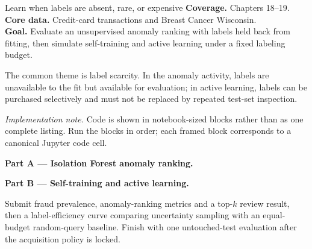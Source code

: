 
\begin{labproject}{Learn when labels are absent, rare, or expensive}
\textbf{Coverage.} Chapters 18--19.\\
\textbf{Core data.} Credit-card transactions and Breast Cancer Wisconsin.\\
\textbf{Goal.} Evaluate an unsupervised anomaly ranking with labels held back from fitting, then simulate self-training and active learning under a fixed labeling budget.

\begin{labmode}
The common theme is label scarcity. In the anomaly activity, labels are unavailable to the fit but available for evaluation; in active learning, labels can be purchased selectively and must not be replaced by repeated test-set inspection.
\end{labmode}

\smallskip\noindent\textit{Implementation note.} Code is shown in notebook-sized blocks rather than as one complete listing. Run the blocks in order; each framed block corresponds to a canonical Jupyter code cell.\par

\medskip\noindent\textbf{Part A --- Isolation Forest anomaly ranking.}\par






\medskip\noindent\textbf{Part B --- Self-training and active learning.}\par








\end{labproject}

\begin{labdeliverable}
Submit fraud prevalence, anomaly-ranking metrics and a top-$k$ review result, then a label-efficiency curve comparing uncertainty sampling with an equal-budget random-query baseline. Finish with one untouched-test evaluation after the acquisition policy is locked.
\end{labdeliverable}
